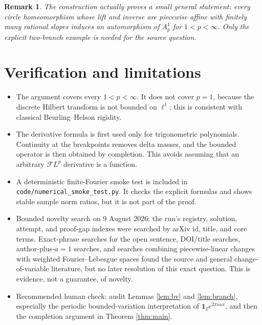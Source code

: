 \documentclass[11pt]{article}
\newtheorem{remark}{Remark}
\newcommand{\FL}{\mathcal F L}
\newcommand{\one}{\mathbf 1}
\begin{document}
\begin{remark}
The construction actually proves a small general statement: every circle
homeomorphism whose lift and inverse are piecewise affine with finitely many
rational slopes induces an automorphism of $A_p^1$ for
$1<p<\infty$.  Only the explicit two-branch example is needed for the source
question.
\end{remark}

\section{Verification and limitations}

\begin{itemize}
\item The argument covers every $1<p<\infty$.  It does not cover $p=1$,
because the discrete Hilbert transform is not bounded on $\ell^1$; this is
consistent with classical Beurling--Helson rigidity.
\item The derivative formula is first used only for trigonometric
polynomials.  Continuity at the breakpoints removes delta masses, and the
bounded operator is then obtained by completion.  This avoids assuming that
an arbitrary $\FL^p$ derivative is a function.
\item A deterministic finite-Fourier smoke test is included in
\texttt{code/numerical\_smoke\_test.py}.  It checks the explicit formulas and
shows stable sample norm ratios, but it is not part of the proof.
\item Bounded novelty search on 9 August 2026: the run's registry, solution,
attempt, and proof-gap indexes were searched by arXiv id, title, and core
terms.  Exact-phrase searches for the open sentence, DOI/title searches,
author-plus-$a=1$ searches, and searches combining piecewise-linear changes
with weighted Fourier--Lebesgue spaces found the source and general
change-of-variable literature, but no later resolution of this exact
question.  This is evidence, not a guarantee, of novelty.
\item Recommended human check: audit Lemmas \ref{lem:bv} and
\ref{lem:branch}, especially the periodic bounded-variation interpretation of
$\one_I e^{2\pi i\alpha x}$, and then the completion argument in Theorem
\ref{thm:main}.
\end{itemize}
\end{document}

